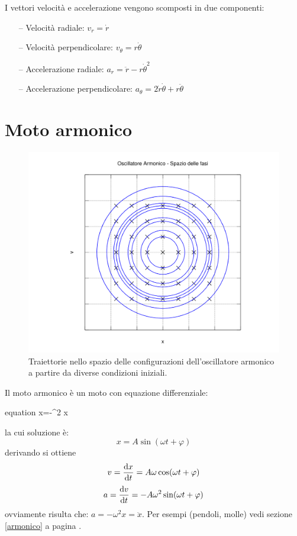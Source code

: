 I vettori velocità e accelerazione vengono scomposti in due
componenti:
\begin{enumerate}
  \item[--] Velocità radiale: $v_r=\dot r$
  \item[--] Velocità perpendicolare: $v_\theta=r\dot\theta$
  \item[--] Accelerazione radiale: $a_r=\ddot r-r\dot\theta^2$
  \item[--] Accelerazione perpendicolare: $a_\theta=2\dot r\dot\theta+r\ddot
      \theta$
\end{enumerate}
\section{Moto armonico}
\begin{figure}[htbp]
  \centering
  \includegraphics[scale=0.6]{immagini/fisica1/oscillatore_fase}
  \caption{Traiettorie nello spazio delle configurazioni dell'oscillatore armonico a partire da diverse condizioni iniziali.}
\end{figure}
Il moto armonico è un moto con equazione differenziale:
\begin{eqimp}{equation}
  \ddot x=-\omega^2 x
\end{eqimp}
la cui soluzione è:
\[x=A\sin(\omega t+\varphi)\]
derivando si ottiene
\[v=\frac{\mathrm{d} x}{\mathrm{d} t}=A\omega\cos(\omega t+\varphi)\]
\[a=\frac{\mathrm{d} v}{\mathrm{d} t}=-A\omega^2\sin(\omega t+\varphi)\]
ovviamente risulta che: $a = -\omega^2 x=\ddot x$.
Per esempi (pendoli, molle) vedi sezione \ref{armonico} a pagina \pageref{armonico}.
